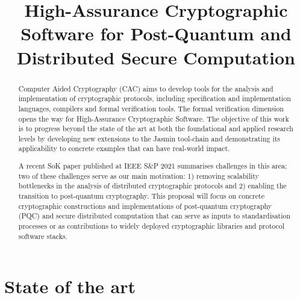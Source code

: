 \documentclass[preprint]{iacrtrans}
\author{}
\institute{}
\title[\texttt{High-Assurance Cryptographic Software for Post-Quantum and Distributed Secure Computation}]{High-Assurance Cryptographic Software for Post-Quantum and Distributed Secure Computation}
\begin{document}
\maketitle


\begin{abstract}
  Computer Aided Cryptography (CAC) aims to develop tools for the analysis and implementation of cryptographic protocols, including specification and implementation languages, compilers and formal verification tools. The formal verification dimension opens the way for High-Assurance Cryptographic Software. The objective of this work is to progress beyond the state of the art at both the foundational and applied research levels by developing new extensions to the Jasmin tool-chain and demonstrating its applicability to concrete examples that can have real-world impact.
  \par A recent SoK paper \cite{SoK} published at IEEE S\&P 2021 summarises challenges in this area; two of these challenges serve as our main motivation: 1) removing scalability bottlenecks in the analysis of distributed cryptographic protocols and 2) enabling the transition to post-quantum cryptography. This proposal will focus on concrete cryptographic constructions and implementations of post-quantum cryptography (PQC) and secure distributed computation that can serve as inputs to standardisation processes or as contributions to widely deployed cryptographic libraries and protocol software stacks.                                  
\end{abstract}

\section*{State of the art}

\end{document}
